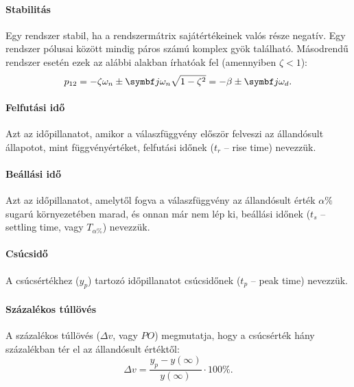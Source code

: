 \paragraph{Stabilitás}

Egy rendszer stabil, ha a rendszermátrix sajátértékeinek valós része negatív.
Egy rendszer pólusai között mindig páros számú komplex gyök található.
Másodrendű rendszer esetén ezek az alábbi alakban írhatóak fel (amennyiben
$\zeta < 1$):
\begin{equation}
  p_{12}
  = -\zeta \omega_n \pm \iu \omega_n \sqrt{1 - \zeta^2}
  = -\beta \pm \iu \omega_d.
  \label{eq:complex-poles}
\end{equation}

\paragraph{Felfutási idő}

Azt az időpillanatot, amikor a válaszfüggvény először felveszi az állandósult
állapotot, mint függvényértéket, felfutási időnek ($t_r$ -- rise time) nevezzük.

\paragraph{Beállási idő}

Azt az időpillanatot, amelytől fogva a válaszfüggvény az állandósult érték
$\alpha\%$ sugarú környezetében marad, és onnan már nem lép ki, beállási időnek
($t_s$ -- settling time, vagy $T_{\alpha\%}$) nevezzük.

\paragraph{Csúcsidő}

A csúcsértékhez ($y_p$) tartozó időpillanatot csúcsidőnek ($t_p$ -- peak time)
nevezzük.

\paragraph{Százalékos túllövés}

A százalékos túllövés ($\Delta v$, vagy $\mathit{PO}$) megmutatja, hogy a
csúcsérték hány százalékban tér el az állandósult értéktől:
\begin{equation}
  \Delta v = \frac{y_p - y(\infty)}{y(\infty)} \cdot 100\%.
  \label{eq:PO}
\end{equation}

